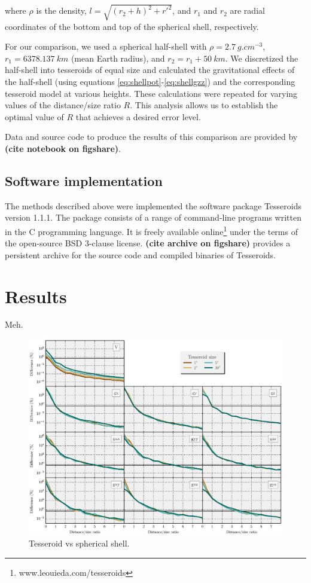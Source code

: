 \documentclass[extra]{gji}
\begin{document}
\noindent
where $\rho$ is the density,
$l = \sqrt{(r_2 + h)^2 + {r'}^2}$,
and
$r_1$ and $r_2$ are radial coordinates of
the bottom and top of the spherical shell,
respectively.

For our comparison,
we used a spherical half-shell with
$\rho=2.7\ g.cm^{-3}$,
$r_1=6378.137\ km$ (mean Earth radius),
and
$r_2 = r_1 + 50\ km$.
We discretized the half-shell
into tesseroids of equal size
and calculated the gravitational effects of
the half-shell
(using equations \ref{eq:shellpot}-\ref{eq:shellgzz})
and the corresponding tesseroid model
at various heights.
These calculations were repeated
for varying values of
the distance/size ratio $R$.
This analysis
allows us to establish
the optimal value of $R$
that achieves a desired error level.

Data and source code to produce the results of this comparison
are provided by \textbf{(cite notebook on figshare)}.

\subsection{Software implementation}

The methods described above
were implemented the software package
Tesseroids version 1.1.1.
The package consists
of a range of command-line programs
written in the C programming language.
It is freely available
online\footnote{www.leouieda.com/tesseroids}
under the terms of
the open-source BSD 3-clause license.
\textbf{(cite archive on figshare)} provides a persistent
archive for the source code and compiled binaries of Tesseroids.


\section{Results}

Meh.

\begin{figure}
    \centering
    \includegraphics[width=\textwidth]{figs/tesseroid-x-shell}
    \caption{
        Tesseroid vs spherical shell.
    }
    \label{fig:tesseroid-x-shell}
\end{figure}
\end{document}
